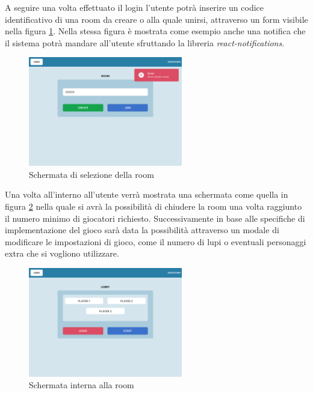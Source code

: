 A seguire una volta effettuato il login l'utente potrà inserire un codice identificativo di una room da creare o alla quale unirsi, attraverso un form visibile nella figura \ref{fig:pcRoom}. Nella stessa figura è mostrata come esempio anche una notifica che il sistema potrà mandare all'utente sfruttando la libreria \emph{react-notifications}\cite{npmjsReactnotifications}.

\begin{figure}[H]
\centering
\includegraphics[width=0.6\textwidth]{img/figma/Wireframe-2.png}
\caption{Schermata di selezione della room}
\label{fig:pcRoom}
\end{figure}

Una volta all'interno all'utente verrà mostrata una schermata come quella in figura \ref{fig:pcLobby} nella quale si avrà la possibilità di chiudere la room una volta raggiunto il numero minimo di giocatori richiesto. Successivamente in base alle specifiche di implementazione del gioco sarà data la possibilità attraverso un modale di modificare le impostazioni di gioco, come il numero di lupi o eventuali personaggi extra che si vogliono utilizzare.

\begin{figure}[H]
\centering
\includegraphics[width=0.6\textwidth]{img/figma/Wireframe-3.png}
\caption{Schermata interna alla room}
\label{fig:pcLobby}
\end{figure}


